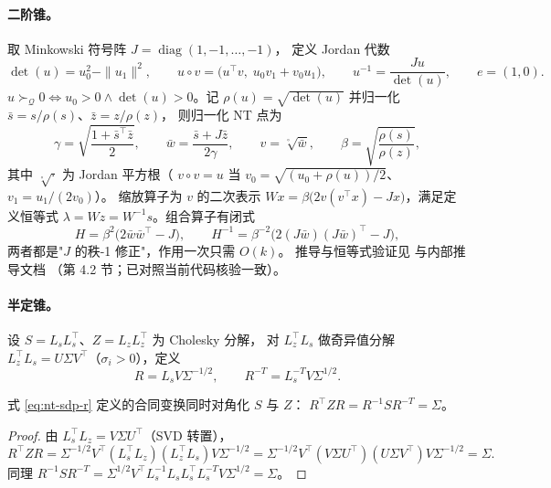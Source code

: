 \paragraph{二阶锥。}取 Minkowski 符号阵 $J = \operatorname{diag}(1, -1, \ldots, -1)$，
定义 Jordan 代数
\[
\det(u) = u_0^2 - \|u_1\|^2, \qquad
u \circ v = \big(u^\top v,\; u_0 v_1 + v_0 u_1\big), \qquad
u^{-1} = \frac{Ju}{\det(u)}, \qquad e = (1, 0).
\]
$u \succ_{\mathcal{Q}} 0 \iff u_0 > 0 \land \det(u) > 0$。记
$\rho(u) = \sqrt{\det(u)}$ 并归一化 $\bar s = s/\rho(s)$、$\bar z = z/\rho(z)$，
则归一化 NT 点为
\begin{equation}
\label{eq:nt-soc}
\gamma = \sqrt{\frac{1 + \bar s^\top \bar z}{2}}, \qquad
\bar w = \frac{\bar s + J \bar z}{2\gamma}, \qquad
v = \sqrt[\circ]{\bar w}, \qquad
\beta = \sqrt{\frac{\rho(s)}{\rho(z)}},
\end{equation}
其中 $\sqrt[\circ]{\cdot}$ 为 Jordan 平方根（
$v \circ v = u$ 当 $v_0 = \sqrt{(u_0 + \rho(u))/2}$、$v_1 = u_1/(2v_0)$）。
缩放算子为 $v$ 的二次表示
$Wx = \beta\big(2v(v^\top x) - Jx\big)$，满足定义恒等式
$\lambda = Wz = W^{-1}s$。组合算子有闭式
\begin{equation}
\label{eq:nt-soc-h}
H = \beta^2\big(2\bar w \bar w^\top - J\big), \qquad
H^{-1} = \beta^{-2}\big(2(J\bar w)(J\bar w)^\top - J\big),
\end{equation}
两者都是"$J$ 的秩-1 修正"，作用一次只需 $O(k)$。
推导与恒等式验证见 \cite{vandenberghe2010} 与内部推导文档
（第 4.2 节；已对照当前代码核验一致）。

\paragraph{半定锥。}设 $S = L_s L_s^\top$、$Z = L_z L_z^\top$ 为 Cholesky 分解，
对 $L_z^\top L_s$ 做奇异值分解 $L_z^\top L_s = U\Sigma V^\top$（$\sigma_i > 0$），定义
\begin{equation}
\label{eq:nt-sdp-r}
R = L_s V \Sigma^{-1/2}, \qquad R^{-T} = L_s^{-T} V \Sigma^{1/2}.
\end{equation}

\begin{proposition}[NT 合同恒等式]
\label{prop:nt-sdp}
式 \eqref{eq:nt-sdp-r} 定义的合同变换同时对角化 $S$ 与 $Z$：
$R^\top Z R = R^{-1} S R^{-T} = \Sigma$。
\end{proposition}
\begin{proof}
由 $L_s^\top L_z = V\Sigma U^\top$（SVD 转置），
\[
R^\top Z R = \Sigma^{-1/2} V^\top (L_s^\top L_z)(L_z^\top L_s) V \Sigma^{-1/2}
= \Sigma^{-1/2} V^\top (V\Sigma U^\top)(U\Sigma V^\top) V \Sigma^{-1/2} = \Sigma.
\]
同理
$R^{-1} S R^{-T} = \Sigma^{1/2} V^\top L_s^{-1} L_s L_s^\top L_s^{-T} V \Sigma^{1/2}
= \Sigma$。
\end{proof}

